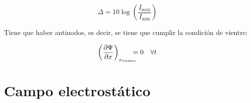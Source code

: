 \documentclass[a4paper]{book}
\begin{document}
\begin{fleqn}
\begin{multicols}{2}
		\[\Delta = 10 \log{\left( \frac{I_{\text{máx}}}{I_{\text{mín}}} \right)}\]

		\vspace{5pt}

		\noindent Tiene que haber antinodos, es decir, se tiene que cumplir la condición de vientre:

		\[\left( \pdv{\Psi}{x} \right)_{x_{\text{vientre}}}\! \! \! \! \! =0\quad \forall t\]

	\end{multicols}
\end{fleqn}

\newpage
\section{Campo electrostático}
\end{document}
